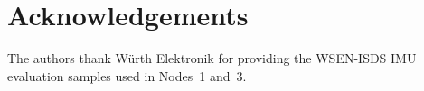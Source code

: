 \documentclass[conference]{IEEEtran}
\begin{document}
\section*{Acknowledgements}
The authors thank W\"urth Elektronik for providing the WSEN-ISDS
IMU evaluation samples used in Nodes~1 and~3.

\balance


\end{document}
